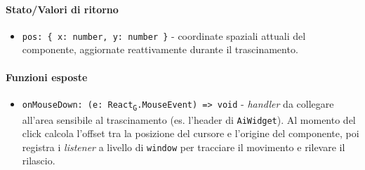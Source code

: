 \documentclass[11pt,a4paper]{article}
\newcommand{\gls}[1]{#1\textsubscript{G}}
\begin{document}
\paragraph{Stato/Valori di ritorno}
\begin{itemize}
    \item \texttt{pos: \{ x: number, y: number \}} - coordinate spaziali attuali del componente, aggiornate reattivamente durante il trascinamento.
\end{itemize}

\paragraph{Funzioni esposte}
\begin{itemize}
    \item \texttt{onMouseDown: (e: \gls{React}.MouseEvent) => void} - \textit{handler} da collegare all'area sensibile al trascinamento (es. l'header di \texttt{AiWidget}). Al momento del click calcola l'offset tra la posizione del cursore e l'origine del componente, poi registra i \textit{listener} a livello di \texttt{window} per tracciare il movimento e rilevare il rilascio.
\end{itemize}


\newpage
\end{document}
